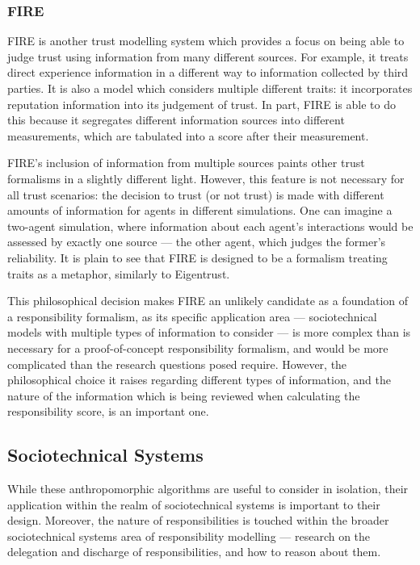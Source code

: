 \subsubsection{FIRE}
FIRE\cite{huynh2004fire} is another trust modelling system which provides a focus on being able to judge trust using information from many different sources. For example, it treats direct experience  information in a different way to information collected by third parties. It is also a model which considers multiple different traits: it incorporates reputation information into its judgement of trust. In part, FIRE is able to do this because it segregates different information sources into different measurements, which are tabulated into a score after their measurement.\par

FIRE's inclusion of information from multiple sources paints other trust formalisms in a slightly different light. However, this feature is not necessary for all trust scenarios: the decision to trust (or not trust) is made with different amounts of information for agents in different simulations. One can imagine a two-agent simulation, where information about each agent's interactions would be assessed by exactly one source --- the other agent, which judges the former's reliability. It is plain to see that FIRE is designed to be a formalism treating traits as a metaphor, similarly to Eigentrust.\par

This philosophical decision makes FIRE an unlikely candidate as a foundation of a responsibility formalism, as its specific application area --- sociotechnical models with multiple types of information to consider --- is more complex than is necessary for a proof-of-concept responsibility formalism, and would be more complicated than the research questions posed require. However, the philosophical choice it raises regarding different types of information, and the nature of the information which is being reviewed when calculating the responsibility score, is an important one.\par

\subsection{Sociotechnical Systems}
While these anthropomorphic algorithms are useful to consider in isolation, their application within the realm of sociotechnical systems is important to their design. Moreover, the nature of responsibilities is touched within the broader sociotechnical systems area of responsibility modelling --- research on the delegation and discharge of responsibilities, and how to reason about them.\par


